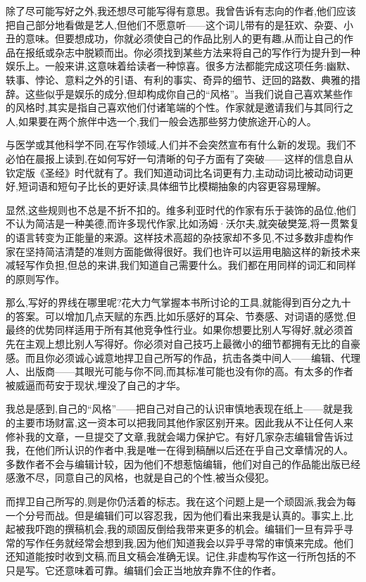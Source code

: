 除了尽可能写好之外,我还想尽可能写得有意思。我曾告诉有志向的作者,他们应该把自己部分地看做是艺人,但他们不愿意听——这个词儿带有的是狂欢、杂耍、小丑的意味。但要想成功，你就必须使自己的作品比别人的更有趣,从而让自己的作品在报纸或杂志中脱颖而出。你必须找到某些方法来将自己的写作行为提升到一种娱乐上。一般来讲,这意味着给读者一种惊喜。很多方法都能完成这项任务:幽默、轶事、悖论、意料之外的引语、有利的事实、奇异的细节、迂回的路数、典雅的措辞。这些似乎是娱乐的成分,但却构成你自己的“风格”。当我们说自己喜欢某些作的风格时,其实是指自己喜欢他们付诸笔端的个性。作家就是邀请我们与其同行之人,如果要在两个旅伴中选一个,我们一般会选那些努力使旅途开心的人。

与医学或其他科学不同,在写作领域,人们并不会突然宣布有什么新的发现。我们不必怕在晨报上读到,在如何写好一句清晰的句子方面有了突破——这样的信息自从钦定版《圣经》时代就有了。我们知道动词比名词更有力,主动动词比被动动词更好,短词语和短句子比长的更好读,具体细节比模糊抽象的内容更容易理解。

显然,这些规则也不总是不折不扣的。维多利亚时代的作家有乐于装饰的品位,他们不认为简洁是一种美德,而许多现代作家,比如汤姆·沃尔夫,就突破樊笼,将一贯繁复的语言转变为正能量的来源。这样技术高超的杂技家却不多见,不过多数非虚构作家在坚持简洁清楚的准则方面能做得很好。我们也许可以运用电脑这样的新技术来减轻写作负担,但总的来讲,我们知道自己需要什么。我们都在用同样的词汇和同样的原则写作。

那么,写好的界线在哪里呢?花大力气掌握本书所讨论的工具,就能得到百分之九十的答案。可以增加几点天赋的东西,比如乐感好的耳朵、节奏感、对词语的感觉,但最终的优势同样适用于所有其他竞争性行业。如果你想要比别人写得好,就必须首先在主观上想比别人写得好。你必须对自己技巧上最微小的细节都拥有无比的自豪感。而且你必须诚心诚意地捍卫自己所写的作品，抗击各类中间人——编辑、代理人、出版商——其眼光可能与你不同,而其标准可能也没有你的高。有太多的作者被威逼而苟安于现状,埋没了自己的才华。

我总是感到,自己的“风格”——把自己对自己的认识审慎地表现在纸上——就是我的主要市场财富,这一资本可以把我同其他作家区别开来。因此我从不让任何人来修补我的文章，一旦提交了文章,我就会竭力保护它。有好几家杂志编辑曾告诉过我，在他们所认识的作者中,我是唯一在得到稿酬以后还在乎自己文章情况的人。多数作者不会与编辑计较，因为他们不想惹恼编辑，他们对自己的作品能出版已经感激不尽，同意自己的风格，也就是自己的个性,被当众侵犯。

而捍卫自己所写的,则是你仍活着的标志。我在这个问题上是一个顽固派,我会为每一个分号而战。但是编辑们可以容忍我，因为他们看出来我是认真的。事实上,比起被我吓跑的撰稿机会,我的顽固反倒给我带来更多的机会。编辑们一旦有异乎寻常的写作任务就经常会想到我,因为他们知道我会以异乎寻常的审慎来完成。他们还知道能按时收到文稿,而且文稿会准确无误。记住,非虚构写作这一行所包括的不只是写。它还意味着可靠。编辑们会正当地放弃靠不住的作者。

